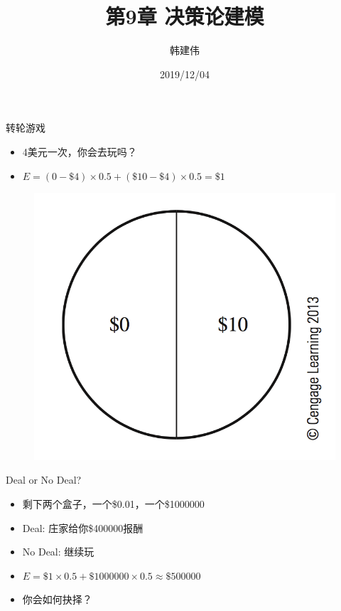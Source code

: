 \documentclass[UTF8]{ctexbeamer}
\title{第9章 决策论建模}
\author{韩建伟}
\institute{
  信息学院\\
  \texttt{hanjianwei@zjgsu.edu.cn}
}
\date{2019/12/04}
\begin{document}
\begin{frame}[plain]
  \titlepage{}
\end{frame}

\begin{frame}{转轮游戏}

  \begin{itemize}
  \item<1-> 4美元一次，你会去玩吗？
  \item<2-> $E = (0-\$4) \times 0.5 + (\$10 - \$4) \times 0.5 = \$1$
  \end{itemize}

  \begin{figure}
    \centering
    \includegraphics[height=.4\textheight{}]{9_1.png}
  \end{figure}
  
\end{frame}

\begin{frame}{Deal or No Deal?}

  \begin{itemize}
  \item<1-> 剩下两个盒子，一个\$0.01，一个\$1000000
  \item<1-> Deal: 庄家给你\$400000报酬
  \item<1-> No Deal: 继续玩
  \item<2-> $E = \$1 \times 0.5 + \$1000000 \times 0.5 \approx \$500000$
  \item<3-> 你会如何抉择？
  \end{itemize}
  
\end{frame}
\end{document}
